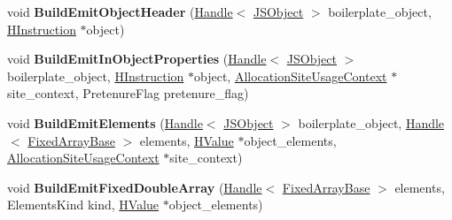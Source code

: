 \begin{DoxyCompactItemize}
\item 
void {\bfseries Build\+Emit\+Object\+Header} (\hyperlink{classv8_1_1internal_1_1_handle}{Handle}$<$ \hyperlink{classv8_1_1internal_1_1_j_s_object}{J\+S\+Object} $>$ boilerplate\+\_\+object, \hyperlink{classv8_1_1internal_1_1_h_instruction}{H\+Instruction} $\ast$object)\hypertarget{classv8_1_1internal_1_1_h_optimized_graph_builder_af6f0efe76df9c5d07c96dfe9ca59fd56}{}\label{classv8_1_1internal_1_1_h_optimized_graph_builder_af6f0efe76df9c5d07c96dfe9ca59fd56}

\item 
void {\bfseries Build\+Emit\+In\+Object\+Properties} (\hyperlink{classv8_1_1internal_1_1_handle}{Handle}$<$ \hyperlink{classv8_1_1internal_1_1_j_s_object}{J\+S\+Object} $>$ boilerplate\+\_\+object, \hyperlink{classv8_1_1internal_1_1_h_instruction}{H\+Instruction} $\ast$object, \hyperlink{classv8_1_1internal_1_1_allocation_site_usage_context}{Allocation\+Site\+Usage\+Context} $\ast$site\+\_\+context, Pretenure\+Flag pretenure\+\_\+flag)\hypertarget{classv8_1_1internal_1_1_h_optimized_graph_builder_aadb7861e5ae6d36df46293b288b3018a}{}\label{classv8_1_1internal_1_1_h_optimized_graph_builder_aadb7861e5ae6d36df46293b288b3018a}

\item 
void {\bfseries Build\+Emit\+Elements} (\hyperlink{classv8_1_1internal_1_1_handle}{Handle}$<$ \hyperlink{classv8_1_1internal_1_1_j_s_object}{J\+S\+Object} $>$ boilerplate\+\_\+object, \hyperlink{classv8_1_1internal_1_1_handle}{Handle}$<$ \hyperlink{classv8_1_1internal_1_1_fixed_array_base}{Fixed\+Array\+Base} $>$ elements, \hyperlink{classv8_1_1internal_1_1_h_value}{H\+Value} $\ast$object\+\_\+elements, \hyperlink{classv8_1_1internal_1_1_allocation_site_usage_context}{Allocation\+Site\+Usage\+Context} $\ast$site\+\_\+context)\hypertarget{classv8_1_1internal_1_1_h_optimized_graph_builder_aef6a8f099d69d93514627e61841c1b05}{}\label{classv8_1_1internal_1_1_h_optimized_graph_builder_aef6a8f099d69d93514627e61841c1b05}

\item 
void {\bfseries Build\+Emit\+Fixed\+Double\+Array} (\hyperlink{classv8_1_1internal_1_1_handle}{Handle}$<$ \hyperlink{classv8_1_1internal_1_1_fixed_array_base}{Fixed\+Array\+Base} $>$ elements, Elements\+Kind kind, \hyperlink{classv8_1_1internal_1_1_h_value}{H\+Value} $\ast$object\+\_\+elements)\hypertarget{classv8_1_1internal_1_1_h_optimized_graph_builder_a5fef1a0988ef40d22027fe6ff2a62d13}{}\label{classv8_1_1internal_1_1_h_optimized_graph_builder_a5fef1a0988ef40d22027fe6ff2a62d13}


\end{DoxyCompactItemize}
